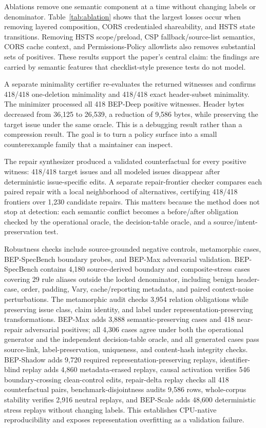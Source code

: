 \documentclass[10pt,conference]{IEEEtran}
\begin{document}
Ablations remove one semantic component at a time without changing labels or denominator. Table~\ref{tab:ablation} shows that the largest losses occur when removing layered composition, CORS credentialed shareability, and HSTS state transitions. Removing HSTS scope/preload, CSP fallback/source-list semantics, CORS cache context, and Permissions-Policy allowlists also removes substantial sets of positives. These results support the paper's central claim: the findings are carried by semantic features that checklist-style presence tests do not model.



A separate minimality certifier re-evaluates the returned witnesses and confirms 418/418 one-deletion minimality and 418/418 exact header-subset minimality. The minimizer processed all 418 BEP-Deep positive witnesses. Header bytes decreased from 36,125 to 26,539, a reduction of 9,586 bytes, while preserving the target issue under the same oracle. This is a debugging result rather than a compression result. The goal is to turn a policy surface into a small counterexample family that a maintainer can inspect.


The repair synthesizer produced a validated counterfactual for every positive witness: 418/418 target issues and all modeled issues disappear after deterministic issue-specific edits. A separate repair-frontier checker compares each paired repair with a local neighborhood of alternatives, certifying 418/418 frontiers over 1,230 candidate repairs. This matters because the method does not stop at detection: each semantic conflict becomes a before/after obligation checked by the operational oracle, the decision-table oracle, and a source/intent-preservation test.

Robustness checks include source-grounded negative controls, metamorphic cases, BEP-SpecBench boundary probes, and BEP-Max adversarial validation. BEP-SpecBench contains 4,180 source-derived boundary and composite-stress cases covering 29 rule aliases outside the locked denominator, including benign header-case, order, padding, Vary, cache/reporting metadata, and paired context-noise perturbations. The metamorphic audit checks 3,954 relation obligations while preserving issue class, claim identity, and label under representation-preserving transformations. BEP-Max adds 3,888 semantic-preserving cases and 418 near-repair adversarial positives; all 4,306 cases agree under both the operational generator and the independent decision-table oracle, and all generated cases pass source-link, label-preservation, uniqueness, and content-hash integrity checks. BEP-Shadow adds 9,720 required representation-preserving replays, identifier-blind replay adds 4,860 metadata-erased replays, causal activation verifies 546 boundary-crossing clean-control edits, repair-delta replay checks all 418 counterfactual pairs, benchmark-disjointness audits 9,586 rows, whole-corpus stability verifies 2,916 neutral replays, and BEP-Scale adds 48,600 deterministic stress replays without changing labels. This establishes CPU-native reproducibility and exposes representation overfitting as a validation failure.
\end{document}

